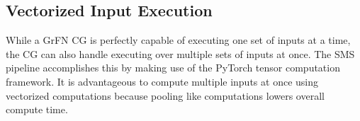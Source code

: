 \subsection{Vectorized Input Execution\label{sec:vector_input_execution}}
While a GrFN CG is perfectly capable of executing one set of inputs at a time, the CG can also handle executing over multiple sets of inputs at once. The SMS pipeline accomplishes this by making use of the PyTorch tensor computation framework. It is advantageous to compute multiple inputs at once using vectorized computations because pooling like computations lowers overall compute time.
